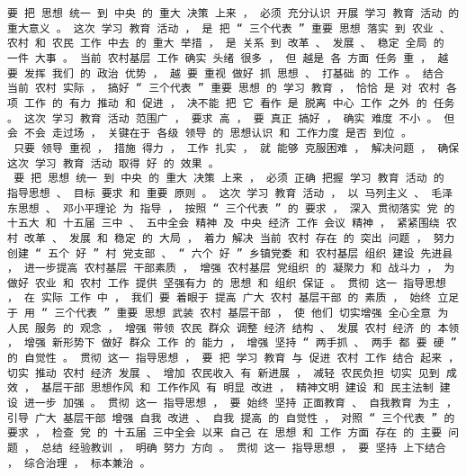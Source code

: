 \documentclass{article}
\begin{document}
\begin{Verbatim}[commandchars=\\\{\}]
 要 把 思想 统一 到 中央 的 重大 决策 上来 ， 必须 充分认识 开展 学习 教育 活动 的 重大意义 。 这次 学习 教育 活动 ， 是 把 “ 三个代表 ” 重要 思想 落实 到 农业 、 农村 和 农民 工作 中去 的 重大 举措 ， 是 关系 到 改革 、 发展 、 稳定 全局 的 一件 大事 。 当前 农村基层 工作 确实 头绪 很多 ， 但 越是 各 方面 任务 重 ， 越 要 发挥 我们 的 政治 优势 ， 越 要 重视 做好 抓 思想 、 打基础 的 工作 。 结合 当前 农村 实际 ， 搞好 “ 三个代表 ” 重要 思想 的 学习 教育 ， 恰恰 是 对 农村 各项 工作 的 有力 推动 和 促进 ， 决不能 把 它 看作 是 脱离 中心 工作 之外 的 任务 。 这次 学习 教育 活动 范围广 ， 要求 高 ， 要 真正 搞好 ， 确实 难度 不小 。 但会 不会 走过场 ， 关键在于 各级 领导 的 思想认识 和 工作力度 是否 到位 。 
 只要 领导 重视 ， 措施 得力 ， 工作 扎实 ， 就 能够 克服困难 ， 解决问题 ， 确保 这次 学习 教育 活动 取得 好 的 效果 。 
 要 把 思想 统一 到 中央 的 重大 决策 上来 ， 必须 正确 把握 学习 教育 活动 的 指导思想 、 目标 要求 和 重要 原则 。 这次 学习 教育 活动 ， 以 马列主义 、 毛泽东思想 、 邓小平理论 为 指导 ， 按照 “ 三个代表 ” 的 要求 ， 深入 贯彻落实 党 的 十五大 和 十五届 三中 、 五中全会 精神 及 中央 经济 工作 会议 精神 ， 紧紧围绕 农村 改革 、 发展 和 稳定 的 大局 ， 着力 解决 当前 农村 存在 的 突出 问题 ， 努力 创建 “ 五个 好 ” 村 党支部 、 “ 六个 好 ” 乡镇党委 和 农村基层 组织 建设 先进县 ， 进一步提高 农村基层 干部素质 ， 增强 农村基层 党组织 的 凝聚力 和 战斗力 ， 为 做好 农业 和 农村 工作 提供 坚强有力 的 思想 和 组织 保证 。 贯彻 这一 指导思想 ， 在 实际 工作 中 ， 我们 要 着眼于 提高 广大 农村 基层干部 的 素质 ， 始终 立足于 用 “ 三个代表 ” 重要 思想 武装 农村 基层干部 ， 使 他们 切实增强 全心全意 为 人民 服务 的 观念 ， 增强 带领 农民 群众 调整 经济 结构 、 发展 农村 经济 的 本领 ， 增强 新形势下 做好 群众 工作 的 能力 ， 增强 坚持 “ 两手抓 、 两手 都 要 硬 ” 的 自觉性 。 贯彻 这一 指导思想 ， 要 把 学习 教育 与 促进 农村 工作 结合 起来 ， 切实 推动 农村 经济 发展 、 增加 农民收入 有 新进展 ， 减轻 农民负担 切实 见到 成效 ， 基层干部 思想作风 和 工作作风 有 明显 改进 ， 精神文明 建设 和 民主法制 建设 进一步 加强 。 贯彻 这一 指导思想 ， 要 始终 坚持 正面教育 、 自我教育 为主 ， 引导 广大 基层干部 增强 自我 改进 、 自我 提高 的 自觉性 ， 对照 “ 三个代表 ” 的 要求 ， 检查 党 的 十五届 三中全会 以来 自己 在 思想 和 工作 方面 存在 的 主要 问题 ， 总结 经验教训 ， 明确 努力 方向 。 贯彻 这一 指导思想 ， 要 坚持 上下结合 ， 综合治理 ， 标本兼治 。 

\end{Verbatim}
\end{document}
